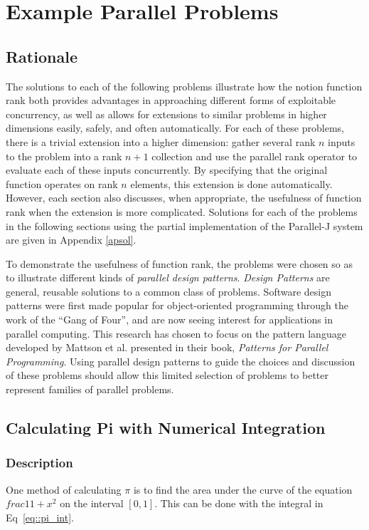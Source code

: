 \chapter{Example Parallel Problems}
\label{probs}

\section{Rationale}
The solutions to each of the following problems illustrate how the notion function rank both
provides advantages in approaching different forms of exploitable concurrency, 
as well as allows for extensions to similar problems in higher dimensions easily, safely, and often automatically.
For each of these problems, there is a trivial extension into a higher dimension: 
gather several rank $n$ inputs to the problem into a rank $n+1$ collection 
and use the parallel rank operator to evaluate each of these inputs concurrently.
By specifying that the original function operates on rank $n$ elements, 
this extension is done automatically. 
However, each section also discusses, when appropriate, 
the usefulness of function rank when the extension is more complicated.
Solutions for each of the problems in the following sections using the partial implementation of the Parallel-J system
are given in Appendix \ref{apsol}.

To demonstrate the usefulness of function rank, 
the problems were chosen so as to illustrate different kinds of \textit{parallel design patterns}. 
\textit{Design Patterns} are general, reusable solutions to a common class of problems. %
Software design patterns were first made popular for object-oriented programming through 
the work of the ``Gang of Four''\cite{designp},
and are now seeing interest for applications in parallel computing\cite{mass}.
This research has chosen to focus on the pattern language developed by Mattson et al. 
presented in their book, \textit{Patterns for Parallel Programming}\cite{mass}. %
Using parallel design patterns to guide the choices and discussion of these problems 
should allow this limited selection of problems to better represent families of parallel problems.

\section{Calculating Pi with Numerical Integration}
\subsection{Description}
One method of calculating $\pi$ is to find the area under 
the curve of the equation $frac{1}{1+x^2}$ on the interval $[0,1]$.
This can be done with the integral in Eq~\ref{eq::pi_int}.

